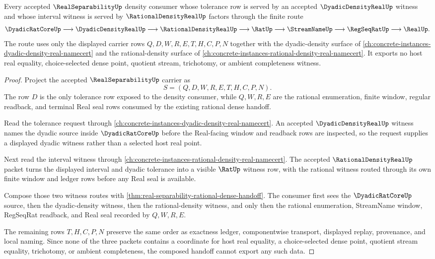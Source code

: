 \begin{theorem}
\label{thm:real-separability-dyadic-rational-density-handoff}
Every accepted $\RealSeparabilityUp$ density consumer whose tolerance row is served by an accepted $\DyadicDensityRealUp$ witness and whose interval witness is served by $\RationalDensityRealUp$ factors through the finite route
$$
\DyadicRatCoreUp \longrightarrow \DyadicDensityRealUp \longrightarrow \RationalDensityRealUp \longrightarrow \RatUp \longrightarrow \StreamNameUp \longrightarrow \RegSeqRatUp \longrightarrow \RealUp .
$$
The route uses only the displayed carrier rows $Q,D,W,R,E,T,H,C,P,N$ together with the dyadic-density surface of \autoref{ch:concrete-instances-dyadic-density-real-namecert} and the rational-density surface of \autoref{ch:concrete-instances-rational-density-real-namecert}. It exports no host real equality, choice-selected dense point, quotient stream, trichotomy, or ambient completeness witness.
\end{theorem}
\begin{proof}
Project the accepted $\RealSeparabilityUp$ carrier as
$$
S=(Q,D,W,R,E,T,H,C,P,N).
$$
The row $D$ is the only tolerance row exposed to the density consumer, while $Q,W,R,E$ are the rational enumeration, finite window, regular readback, and terminal Real seal rows consumed by the existing rational dense handoff.

Read the tolerance request through \autoref{ch:concrete-instances-dyadic-density-real-namecert}. An accepted $\DyadicDensityRealUp$ witness names the dyadic source inside $\DyadicRatCoreUp$ before the Real-facing window and readback rows are inspected, so the request supplies a displayed dyadic witness rather than a selected host real point.

Next read the interval witness through \autoref{ch:concrete-instances-rational-density-real-namecert}. The accepted $\RationalDensityRealUp$ packet turns the displayed interval and dyadic tolerance into a visible $\RatUp$ witness row, with the rational witness routed through its own finite window and ledger rows before any Real seal is available.

Compose those two witness routes with \autoref{thm:real-separability-rational-dense-handoff}. The consumer first sees the $\DyadicRatCoreUp$ source, then the dyadic-density witness, then the rational-density witness, and only then the rational enumeration, StreamName window, RegSeqRat readback, and Real seal recorded by $Q,W,R,E$.

The remaining rows $T,H,C,P,N$ preserve the same order as exactness ledger, componentwise transport, displayed replay, provenance, and local naming. Since none of the three packets contains a coordinate for host real equality, a choice-selected dense point, quotient stream equality, trichotomy, or ambient completeness, the composed handoff cannot export any such data.
\end{proof}

